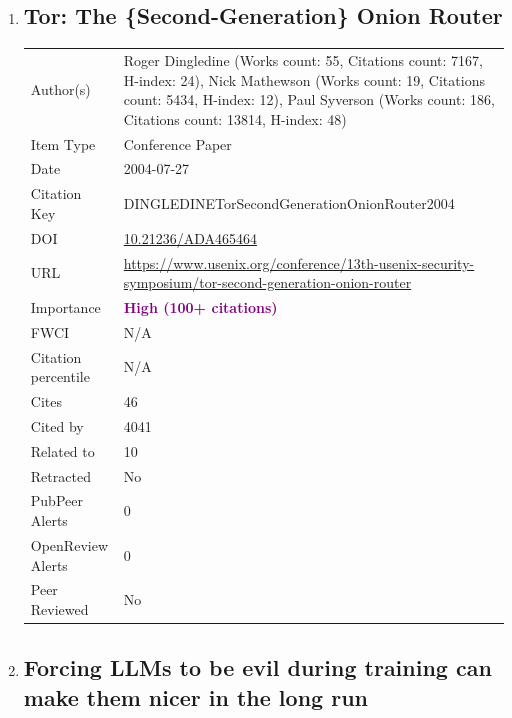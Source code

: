 \documentclass{article}
\begin{document}
\begin{enumerate}[label=\arabic*., font=\Large]
\item
{}\label{tor-the-second-generation-onion-router}
\hypertarget{item_DINGLEDINETorSecondGenerationOnionRouter2004}{}
\subsection*{Tor: The \{Second-Generation\} Onion Router}

\begin{longtable}{p{} p{\contentcolwidth-2\tabcolsep}}
\toprule
Author(s) & Roger Dingledine (Works count: 55, Citations count: 7167, H-index: 24), Nick Mathewson (Works count: 19, Citations count: 5434, H-index: 12), Paul Syverson (Works count: 186, Citations count: 13814, H-index: 48) \\
Item Type & Conference Paper \\
Date & 2004-07-27 \\
Citation Key & DINGLEDINETorSecondGenerationOnionRouter2004 \\
DOI & \href{http://doi.org/10.21236/ADA465464}{10.21236/ADA465464} \\
URL & \url{https://www.usenix.org/conference/13th-usenix-security-symposium/tor-second-generation-onion-router} \\
Importance & \textbf{\textcolor{purple}{High (100+ citations)}} \\
FWCI & N/A \\
Citation percentile & N/A \\
Cites & 46 \\
Cited by & 4041 \\
Related to & 10 \\
Retracted & No \\
PubPeer Alerts & 0 \\
OpenReview Alerts & 0 \\
Peer Reviewed & No \\
\bottomrule
\end{longtable}

\item
{}\label{forcing-llms-to-be-evil-during-training-can-make-them-nicer-in-the-long-run}
\hypertarget{item_Forcingllmstobeevilduringtrainingcanmakethemnicerinthelongrun}{}
\subsection*{Forcing LLMs to be evil during training can make them nicer in the long run}


\end{enumerate}
\end{document}
